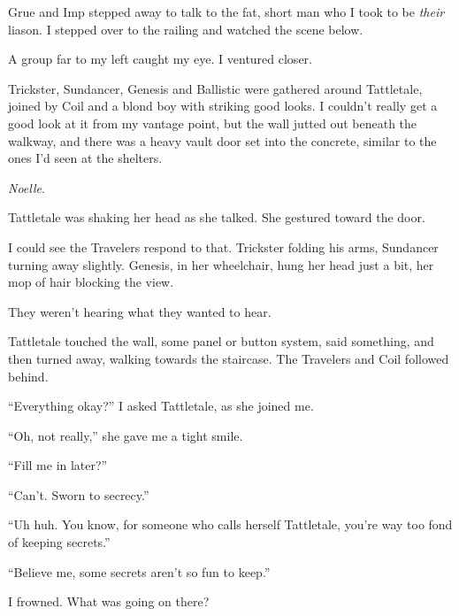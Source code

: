 Grue and Imp stepped away to talk to the fat, short man who I took to be \emph{their} liason.  I stepped over to the railing and watched the scene below.



A group far to my left caught my eye.  I ventured closer.



Trickster, Sundancer, Genesis and Ballistic were gathered around Tattletale, joined by Coil and a blond boy with striking good looks.  I couldn't really get a good look at it from my vantage point, but the wall jutted out beneath the walkway, and there was a heavy vault door set into the concrete, similar to the ones I'd seen at the shelters.



\emph{Noelle}.



Tattletale was shaking her head as she talked.  She gestured toward the door.



I could see the Travelers respond to that.  Trickster folding his arms, Sundancer turning away slightly.  Genesis, in her wheelchair, hung her head just a bit, her mop of hair blocking the view.



They weren't hearing what they wanted to hear.



Tattletale touched the wall, some panel or button system, said something, and then turned away, walking towards the staircase.  The Travelers and Coil followed behind.



``Everything okay?'' I asked Tattletale, as she joined me.



``Oh, not really,'' she gave me a tight smile.



``Fill me in later?''



``Can't.  Sworn to secrecy.''



``Uh huh.  You know, for someone who calls herself Tattletale, you're way too fond of keeping secrets.''



``Believe me, some secrets aren't so fun to keep.''



I frowned.  What was going on there?



